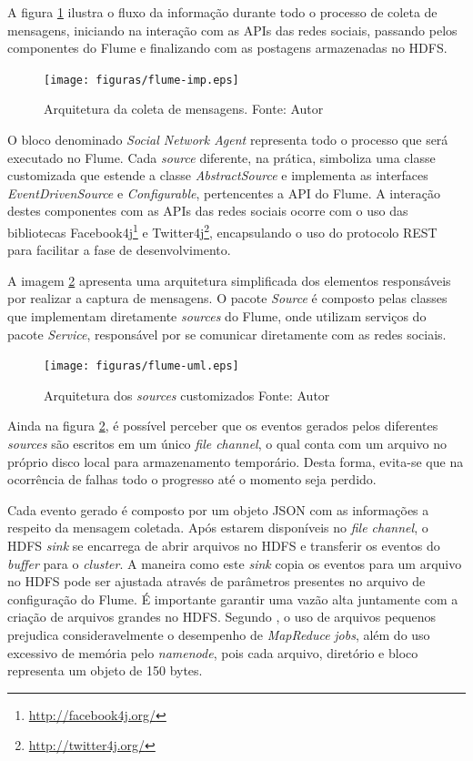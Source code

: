 A figura \ref{flume-imp} ilustra o fluxo da informação durante todo o processo de coleta de mensagens, iniciando na interação com as APIs das redes sociais, passando pelos componentes do Flume e finalizando com as postagens armazenadas no HDFS.

\begin{figure}[ht!]
	\centering
	\texttt{[image: figuras/flume-imp.eps]}
	\caption[Arquitetura da coleta de mensagens.]{Arquitetura da coleta de mensagens.
	\protect\linebreak Fonte: Autor}
	\label{flume-imp}
\end{figure}
\FloatBarrier

O bloco denominado \textit{Social Network Agent} representa todo o processo que será executado no Flume. Cada \textit{source} diferente, na prática, simboliza uma classe customizada que estende a classe \textit{AbstractSource} e implementa as interfaces \textit{EventDrivenSource} e \textit{Configurable}, pertencentes a API do Flume. A interação destes componentes com as APIs das redes sociais ocorre com o uso das bibliotecas Facebook4j\footnote{\url{http://facebook4j.org/}} e Twitter4j\footnote{\url{http://twitter4j.org/}}, encapsulando o uso do protocolo REST para facilitar a fase de desenvolvimento.

A imagem \ref{flume-uml} apresenta uma arquitetura simplificada dos elementos responsáveis por realizar a captura de mensagens. O pacote \textit{Source} é composto pelas classes que implementam diretamente \textit{sources} do Flume, onde utilizam serviços do pacote \textit{Service}, responsável por se comunicar diretamente com as redes sociais.

\begin{figure}[ht!]
	\centering
	\texttt{[image: figuras/flume-uml.eps]}
	\caption[Arquitetura dos \textit{sources} customizados]{Arquitetura dos \textit{sources} customizados
	\protect\linebreak Fonte: Autor}
	\label{flume-uml}
\end{figure}
\FloatBarrier

Ainda na figura \ref{flume-uml}, é possível perceber que os eventos gerados pelos diferentes \textit{sources} são escritos em um único \textit{file channel}, o qual conta com um arquivo no próprio disco local para armazenamento temporário. Desta forma, evita-se que na ocorrência de falhas todo o progresso até o momento seja perdido.

Cada evento gerado é composto por um objeto JSON com as informações a respeito da mensagem coletada. Após estarem disponíveis no \textit{file channel}, o HDFS \textit{sink} se encarrega de abrir arquivos no HDFS e transferir os eventos do \textit{buffer} para o \textit{cluster}. A maneira como este \textit{sink} copia os eventos para um arquivo no HDFS pode ser ajustada através de parâmetros presentes no arquivo de configuração do Flume. É importante garantir uma vazão alta juntamente com a criação de arquivos grandes no HDFS. Segundo , o uso de arquivos pequenos prejudica consideravelmente o desempenho de \textit{MapReduce} \textit{jobs}, além do uso excessivo de memória pelo \textit{namenode}, pois cada arquivo, diretório e bloco representa um objeto de 150 bytes.

